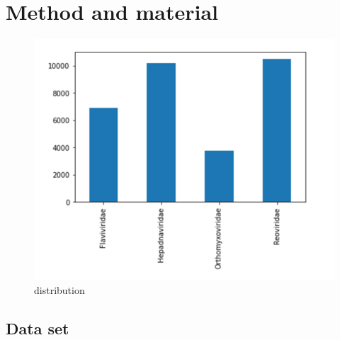 \section {Method and material}

\begin{figure}[t]
	\begin{centering}
		\includegraphics[width=.48\textwidth]{Figures/dist.png}
	\caption{distribution  }
\label{fig:distr}
\end{centering}
\end{figure}

\subsection{Data set}
\label{sec:obj:det}



